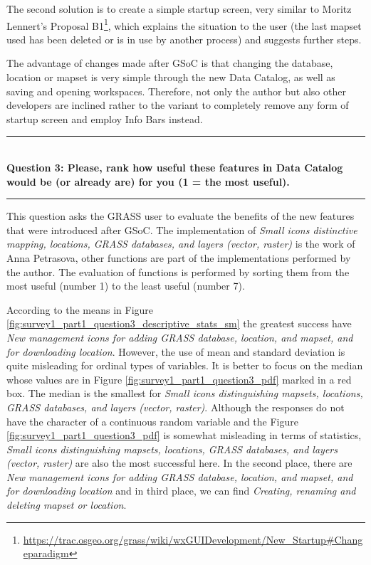 \documentclass[a4paper,10pt,twoside]{article}
\begin{document}
The second solution is to create a simple startup screen, very similar to Moritz Lennert's Proposal B1\footnote{\url{https://trac.osgeo.org/grass/wiki/wxGUIDevelopment/New\_Startup\#Changeparadigm}}, which explains the situation to the user (the last mapset used has been deleted or is in use by another process) and suggests further steps.

The advantage of changes made after GSoC is that changing the database, location or mapset is very simple through the new Data Catalog, as well as saving and opening workspaces. Therefore, not only the author but also other developers are inclined rather to the variant to completely remove any form of startup screen and employ Info Bars instead.

\par\noindent\rule{\textwidth}{0.4pt} \\
\noindent \textbf{Question 3: Please, rank how useful these features in Data Catalog would be (or already are) for you (1 = the most useful).}
\par\noindent\rule{\textwidth}{0.4pt}

\noindent This question asks the GRASS user to evaluate the benefits of the new features that were introduced after GSoC. The implementation of \textit{Small icons distinctive mapping, locations, GRASS databases, and layers (vector, raster)} is the work of Anna Petrasova, other functions are part of the implementations performed by the author. The evaluation of functions is performed by sorting them from the most useful (number 1) to the least useful (number 7).

According to the means in Figure \ref{fig:survey1_part1_question3_descriptive_stats_sm} the greatest success have \textit{New management icons for adding GRASS database, location, and mapset, and for downloading location}. However, the use of mean and standard deviation is quite misleading for ordinal types of variables. It is better to focus on the median whose values are in Figure \ref{fig:survey1_part1_question3_pdf} marked in a red box. The median is the smallest for \textit{Small icons distinguishing mapsets, locations, GRASS databases, and layers (vector, raster)}. Although the responses do not have the character of a continuous random variable and the Figure \ref{fig:survey1_part1_question3_pdf} is somewhat misleading in terms of statistics, \textit{Small icons distinguishing mapsets, locations, GRASS databases, and layers (vector, raster) } are also the most successful here. In the second place, there are \textit{New management icons for adding GRASS database, location, and mapset, and for downloading location} and in third place, we can find \textit{Creating, renaming and deleting mapset or location}.
\end{document}
